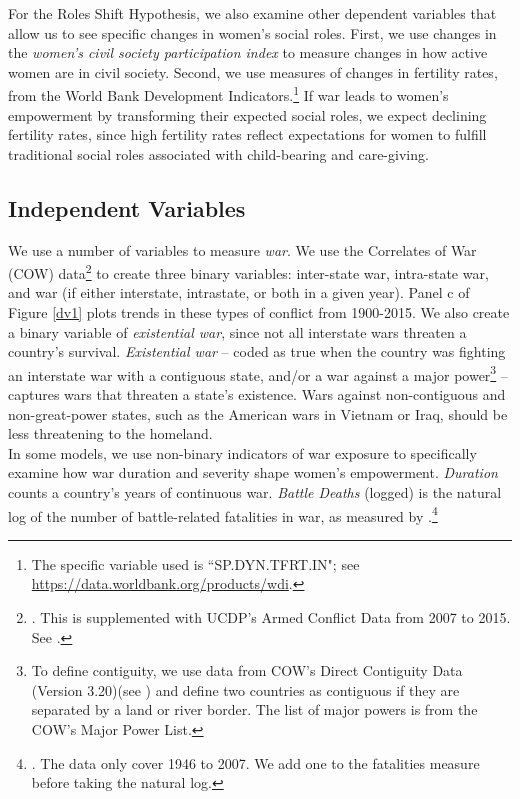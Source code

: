 \documentclass [12pt] {article}
\begin{document}
For the Roles Shift Hypothesis, we also examine other dependent variables that allow us to see specific changes in women's social roles. First, we use changes in the {\it women's civil society participation index} to measure changes in how active women are in civil society. Second, we use measures of changes in fertility rates, from the World Bank Development Indicators.\footnote{The specific variable used is ``SP.DYN.TFRT.IN"; see \href{https://data.worldbank.org/products/wdi}{https://data.worldbank.org/products/wdi}.} If war leads to women's empowerment by transforming their expected social roles, we expect declining fertility rates, since high fertility rates reflect expectations for women to fulfill traditional social roles associated with child-bearing and care-giving.\\


\subsection*{Independent Variables}
\vspace*{.2in}

We use a number of variables to measure {\it war}.  We use the Correlates of War (COW) data\footnote{. This is supplemented with UCDP's Armed Conflict Data from 2007 to 2015. See .} to create three binary variables: inter-state war, intra-state war, and war (if either interstate, intrastate, or both in a given year). Panel c of  Figure \ref{dv1} plots trends in these types of conflict from 1900-2015. We also create a binary variable of {\it existential war}, since not all interstate wars threaten a country's survival. {\it Existential war} -- coded as true when the country was fighting an interstate war with a contiguous state, and/or a war against a major power\footnote{To define contiguity, we use data from COW's Direct Contiguity Data (Version 3.20)(see ) and define  two countries as contiguous if they are separated by a land or river border. The list of major powers is from the COW's Major Power List.} -- captures wars that threaten a state's existence. Wars against non-contiguous and non-great-power states, such as the American wars in Vietnam or Iraq, should be less threatening to the homeland.  \\

In some models, we use non-binary indicators of war exposure to specifically examine how war duration and severity shape women's empowerment. {\it Duration} counts a country's years of continuous war. {\it Battle Deaths} (logged) is the natural log of the number of battle-related fatalities in war, as measured by \citeauthor{lacina:gleditsch}.\footnote{. The data only cover 1946 to 2007. We add one to the fatalities measure before taking the natural log.}  \\
\end{document}
